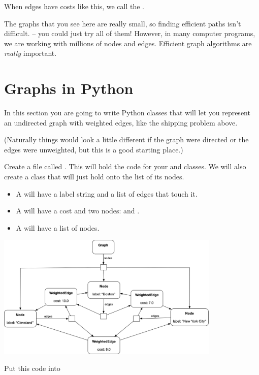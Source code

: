 When edges have costs like this,  we call the .

The graphs that you see here are really small, so finding efficient
paths isn't difficult. -- you could just try all of them! However, in
many computer programs, we are working with millions of nodes and
edges.  Efficient graph algorithms are \textit{really} important.

\section{Graphs in Python}

In this section you are going to write Python classes that will let
you represent an undirected graph with weighted edges, like the
shipping problem above.

(Naturally things would look a little different if the graph were
directed or the edges were unweighted, but this is a good starting
place.)

Create a file called .  This will hold the code for
your  and  classes.  We will also
create a  class that will just hold onto the list of
its nodes.

\begin{itemize}
\item A  will have a label string and a list of edges that touch it.
\item A  will have a cost and two nodes:  and .
\item A  will have a list of nodes.
\end{itemize}

\includegraphics[width=0.8\textwidth]{objdiagram.png}

Put this code into 

